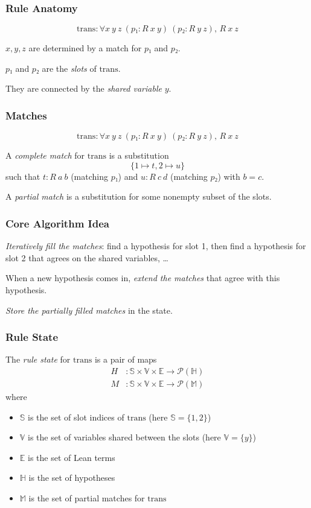\documentclass[xetex]{beamer}
\newcommand{\Expr}{\ensuremath{\mathbb{E}}}
\newcommand{\Hyps}{\ensuremath{\mathbb{H}}}
\newcommand{\Matches}{\ensuremath{\mathbb{M}}}
\newcommand{\Slots}{\ensuremath{\mathbb{S}}}
\newcommand{\Vars}{\ensuremath{\mathbb{V}}}
\newcommand{\Pow}[1]{\ensuremath{\mathcal{P}(#1)}}
\begin{document}
\begin{frame}
  \frametitle{Rule Anatomy}

  \[
    \mathrm{trans} : ∀ x~y~z~(p₁ : R~x~y)~(p₂ : R~y~z),\, R~x~z
  \]

  $x, y, z$ are determined by a match for $p₁$ and $p₂$.

  $p₁$ and $p₂$ are the \emph{slots} of $\mathrm{trans}$.

  They are connected by the \emph{shared variable} $y$.
\end{frame}

\begin{frame}
  \frametitle{Matches}

  \[
    \mathrm{trans} : ∀ x~y~z~(p₁ : R~x~y)~(p₂ : R~y~z),\, R~x~z
  \]

  A \emph{complete match} for $\mathrm{trans}$ is a substitution
  \[
    \{1 ↦ t, 2 ↦ u\}
  \]
  such that $t : R~a~b$ (matching $p₁$) and $u : R~c~d$ (matching $p₂$) with $b = c$.

  A \emph{partial match} is a substitution for some nonempty subset of the slots.
\end{frame}

\begin{frame}
  \frametitle{Core Algorithm Idea}

  \emph{Iteratively fill the matches}: find a hypothesis for slot 1, then find a hypothesis for slot 2 that agrees on the shared variables, \dots

  When a new hypothesis comes in, \emph{extend the matches} that agree with this hypothesis.

  \emph{Store the partially filled matches} in the state.
\end{frame}

\begin{frame}
  \frametitle{Rule State}

  The \emph{rule state} for $\mathrm{trans}$ is a pair of maps
  \begin{align*}
    H &: \Slots × \Vars × \Expr → \Pow{\Hyps} \\
    M &: \Slots × \Vars × \Expr → \Pow{\Matches}
  \end{align*}
  where
  \begin{itemize}
    \item \Slots{} is the set of slot indices of $\mathrm{trans}$ (here $\Slots = \{1,2\}$)
    \item \Vars{} is the set of variables shared between the slots (here $\Vars = \{y\}$)
    \item \Expr{} is the set of Lean terms
    \item \Hyps{} is the set of hypotheses
    \item \Matches{} is the set of partial matches for $\mathrm{trans}$
  \end{itemize}
\end{frame}
\end{document}
